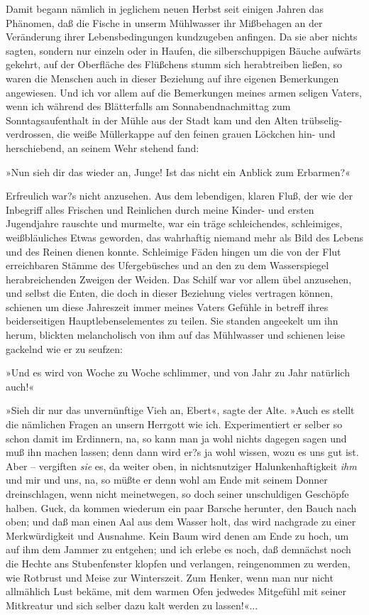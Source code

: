 Damit begann nämlich in jeglichem neuen Herbst seit einigen Jahren
das Phänomen, daß die Fische in unserm Mühlwasser ihr Mißbehagen an
der Veränderung ihrer Lebensbedingungen kundzugeben anfingen. Da
sie aber nichts sagten, sondern nur einzeln oder in Haufen, die
silberschuppigen Bäuche aufwärts gekehrt, auf der Oberfläche des
Flüßchens stumm sich herabtreiben ließen, so waren die Menschen
auch in dieser Beziehung auf ihre eigenen Bemerkungen angewiesen.
Und ich vor allem auf die Bemerkungen meines armen seligen Vaters,
wenn ich während des Blätterfalls am Sonnabendnachmittag zum
Sonntagsaufenthalt in der Mühle aus der Stadt kam und den Alten
trübselig-verdrossen, die weiße Müllerkappe auf den feinen grauen
Löckchen hin- und herschiebend, an seinem Wehr stehend fand:

»Nun sieh dir das wieder an, Junge! Ist das nicht ein Anblick zum
Erbarmen?«

Erfreulich war?s nicht anzusehen. Aus dem lebendigen, klaren Fluß,
der wie der Inbegriff alles Frischen und Reinlichen durch meine
Kinder- und ersten Jugendjahre rauschte und murmelte, war ein träge
schleichendes, schleimiges, weißbläuliches Etwas geworden, das
wahrhaftig niemand mehr als Bild des Lebens und des Reinen dienen
konnte. Schleimige Fäden hingen um die von der Flut erreichbaren
Stämme des Ufergebüsches und an den zu dem Wasserspiegel
herabreichenden Zweigen der Weiden. Das Schilf war vor allem übel
anzusehen, und selbst die Enten, die doch in dieser Beziehung
vieles vertragen können, schienen um diese Jahreszeit immer meines
Vaters Gefühle in betreff ihres beiderseitigen Hauptlebenselementes
zu teilen. Sie standen angeekelt um ihn herum, blickten
melancholisch von ihm auf das Mühlwasser und schienen leise
gackelnd wie er zu seufzen:

»Und es wird von Woche zu Woche schlimmer, und von Jahr zu Jahr
natürlich auch!«

»Sieh dir nur das unvernünftige Vieh an, Ebert«, sagte der Alte.
»Auch es stellt die nämlichen Fragen an unsern Herrgott wie ich.
Experimentiert er selber so schon damit im Erdinnern, na, so kann
man ja wohl nichts dagegen sagen und muß ihn machen lassen; denn
dann wird er?s ja wohl wissen, wozu es uns gut ist. Aber –
vergiften \emph{sie} es, da weiter oben, in nichtsnutziger
Halunkenhaftigkeit \emph{ihm} und mir und uns, na, so müßte er denn
wohl am Ende mit seinem Donner dreinschlagen, wenn nicht
meinetwegen, so doch seiner unschuldigen Geschöpfe halben. Guck, da
kommen wiederum ein paar Barsche herunter, den Bauch nach oben; und
daß man einen Aal aus dem Wasser holt, das wird nachgrade zu einer
Merkwürdigkeit und Ausnahme. Kein Baum wird denen am Ende zu hoch,
um auf ihm dem Jammer zu entgehen; und ich erlebe es noch, daß
demnächst noch die Hechte ans Stubenfenster klopfen und verlangen,
reingenommen zu werden, wie Rotbrust und Meise zur Winterszeit. Zum
Henker, wenn man nur nicht allmählich Lust bekäme, mit dem warmen
Ofen jedwedes Mitgefühl mit seiner Mitkreatur und sich selber dazu
kalt werden zu lassen!«...

